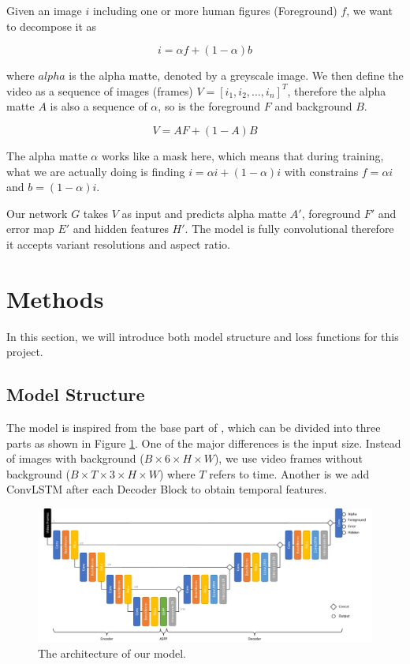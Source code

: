 \documentclass[final]{cvpr}
\begin{document}
Given an image $i$ including one or more human figures (Foreground) $f$, we want to decompose it as

\begin{equation}\label{formulationImage}
    i=\alpha f+(1-\alpha)b
\end{equation}

where $alpha$ is the alpha matte, denoted by a greyscale image.
We then define the video as a sequence of images (frames) $V=[i_1, i_2, \dots, i_n]^T$, therefore the alpha matte $A$ is also a sequence of $\alpha$, so is the foreground $F$ and background $B$.

\begin{equation}\label{formulationVideo}
    V=AF+(1-A)B
\end{equation}

The alpha matte $\alpha$ works like a mask here, which means that during training, what we are actually doing is finding $i=\alpha i+(1-\alpha)i$ with constrains $f=\alpha i$ and $b=(1-\alpha)i$.

Our network $G$ takes $V$ as input and predicts alpha matte $A'$, foreground $F'$ and error map $E'$ and hidden features $H'$.
The model is fully convolutional therefore it accepts variant resolutions and aspect ratio.

\section{Methods}

In this section, we will introduce both model structure and loss functions for this project.

\subsection{Model Structure}

The model is inspired from the base part of \cite{linRealTimeHighResolutionBackground2020a}, which can be divided into three parts as shown in Figure \ref{modelConvLSTM}.
One of the major differences is the input size.
Instead of images with background ($B\times 6\times H \times W$), we use video frames without background ($B\times T\times 3\times H \times W$) where $T$ refers to time.
Another is we add ConvLSTM after each Decoder Block to obtain temporal features.

\begin{figure}[htb]
    \begin{center}
        \includegraphics[width=1\textwidth]{img/modelConvLSTM.pdf}
    \end{center}
    \caption{The architecture of our model.}
    \label{modelConvLSTM}
\end{figure}
\end{document}
